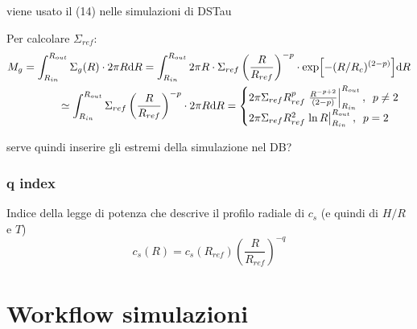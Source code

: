 \documentclass[DIN, pagenumber=false, fontsize=11pt, parskip=half]{scrartcl}
\begin{document}
viene usato il (14) nelle simulazioni di DSTau

\begin{center}
\end{center}
Per calcolare $\Sigma_{ref}$:
\begin{align}
 M_g = \int_{R_{in}}^{R_{out}} \Sigma_g(R) \cdot 2  \pi R \dd R =\int_{R_{in}}^{R_{out}} 2  \pi R \cdot \Sigma_{ref} \left( \frac{R}{R_{ref}}\right)^{-p} \cdot 
 \exp[-(R/R_c)^{(2-p)}] \dd R \\
 \simeq \int_{R_{in}}^{R_{out}} \Sigma_{ref} \left( \frac{R}{R_{ref}}\right)^{-p} \cdot 2  \pi R \dd R =  \begin{cases}
                        2 \pi \Sigma_{ref}R_{ref}^{p} \eval{\frac{R^{-p+2}}{(2-p)}}_{R_{in}}^{R_{out}} , \hspace{5pt} p \neq 2 \\
                        2 \pi \Sigma_{ref}R_{ref}^{2} \eval{\ln R}_{R_{in}}^{R_{out}} , \hspace{5pt} p = 2 \\
\end{cases}
\end{align}

serve quindi inserire gli estremi della simulazione nel DB?


\subsubsection{q index}
\label{qind}
Indice della legge di potenza che descrive il profilo radiale di $c_s$ (e quindi di $H/R$ e $T$)
\begin{equation}
 c_s(R) = c_s(R_{ref}) \left(\frac{R}{R_{ref}} \right)^{-q}
\end{equation}



\section{Workflow simulazioni}
\end{document}
